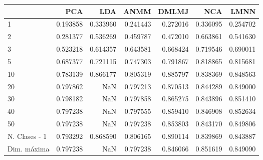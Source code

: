 \begin{tabular}{lrrrrrr}
\toprule
{} &       PCA &       LDA &      ANMM &     DMLMJ &       NCA &      LMNN \\
\midrule
1             &  0.193858 &  0.333960 &  0.241443 &  0.272016 &  0.336095 &  0.254702 \\
2             &  0.281377 &  0.536269 &  0.459787 &  0.472010 &  0.663861 &  0.541630 \\
3             &  0.523218 &  0.614357 &  0.643581 &  0.668424 &  0.719546 &  0.690011 \\
5             &  0.687377 &  0.721115 &  0.747303 &  0.791867 &  0.818865 &  0.815681 \\
10            &  0.783139 &  0.866177 &  0.805319 &  0.885797 &  0.838369 &  0.848563 \\
20            &  0.797862 &       NaN &  0.797213 &  0.870513 &  0.844289 &  0.849000 \\
30            &  0.798182 &       NaN &  0.797858 &  0.865275 &  0.843896 &  0.851410 \\
40            &  0.797238 &       NaN &  0.797555 &  0.859410 &  0.846908 &  0.852634 \\
50            &  0.797238 &       NaN &  0.797238 &  0.853803 &  0.843170 &  0.849806 \\
N. Clases - 1 &  0.793292 &  0.868590 &  0.806165 &  0.890114 &  0.839869 &  0.843887 \\
Dim. máxima   &  0.797238 &       NaN &  0.797238 &  0.846066 &  0.851619 &  0.849090 \\
\bottomrule
\end{tabular}

